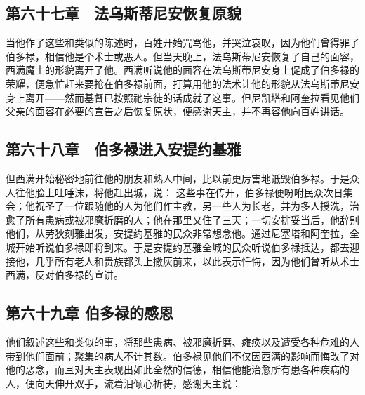 
\subsection{第六十七章　法乌斯蒂尼安恢复原貌}

当他作了这些和类似的陈述时，百姓开始咒骂他，并哭泣哀叹，因为他们曾得罪了伯多禄，相信他是个术士或恶人。但当天晚上，法乌斯蒂尼安恢复了自己的面容，西满魔士的形貌离开了他。西满听说他的面容在法乌斯蒂尼安身上促成了伯多禄的荣耀，便急忙赶来要抢在伯多禄前面，打算用他的法术让他的形貌从法乌斯蒂尼安身上离开——然而基督已按照祂宗徒的话成就了这事。但尼凯塔和阿奎拉看见他们父亲的面容在必要的宣告之后恢复原状，便感谢天主，并不再容他向百姓讲话。\par


\subsection{第六十八章　伯多禄进入安提约基雅}

但西满开始秘密地前往他的朋友和熟人中间，比以前更厉害地诋毁伯多禄。于是众人往他脸上吐唾沫，将他赶出城，说： 这些事在传开，伯多禄便吩咐民众次日集会；他祝圣了一位跟随他的人为他们作主教，另一些人为长老，并为多人授洗，治愈了所有患病或被邪魔折磨的人；他在那里又住了三天；一切安排妥当后，他辞别他们，从劳狄刻雅出发，安提约基雅的民众非常想念他。通过尼塞塔和阿奎拉，全城开始听说伯多禄即将到来。于是安提约基雅全城的民众听说伯多禄抵达，都去迎接他，几乎所有老人和贵族都头上撒灰前来，以此表示忏悔，因为他们曾听从术士西满，反对伯多禄的宣讲。\par


\subsection{第六十九章 伯多禄的感恩}

他们叙述这些和类似的事，将那些患病、被邪魔折磨、瘫痪以及遭受各种危难的人带到他们面前；聚集的病人不计其数。伯多禄见他们不仅因西满的影响而悔改了对他的恶念，而且对天主表现出如此全然的信德，相信他能治愈所有患各种疾病的人，便向天伸开双手，流着泪倾心祈祷，感谢天主说：\par

